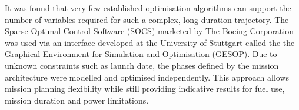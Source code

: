 It was found that very few established optimisation algorithms can support the number of variables required for such a complex, long duration trajectory. The Sparse Optimal Control Software (SOCS) marketed by The Boeing Corporation was used via an interface developed at the University of Stuttgart called the the Graphical Environment for Simulation and Optimisation (GESOP). Due to unknown constraints such as launch date, the phases defined by the mission architecture were modelled and optimised independently. This approach allows mission planning flexibility while still providing indicative results for fuel use, mission duration and power limitations.

\vfill